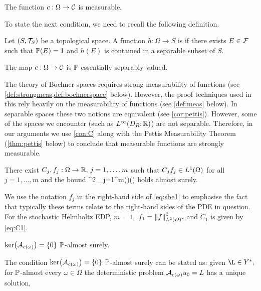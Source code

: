 \label{con:cborel}
 The function $c:\Omega \rightarrow \mathcal C$ is measurable.
\econvar

To state the next condition, we need to recall the following definition.

\label{def:sepval}
Let $\mleft(S,\Top{S}\mright)$ be a topological space. A function $h:\Omega\rightarrow S$ is  if there exists $E \in \mathcal F$ such that $\mathbb P(E) = 1$ and $h(E)$ is contained in a separable subset of $S$.
\ede


\label{con:C}
The map $c:\Omega\rightarrow\mathcal C$  is $\mathbb P$-essentially separably valued.
\econvar

The theory of Bochner spaces requires strong measurability of functions (see \cref{def:strongmeas,def:bochnerspace} below). However, the proof techniques used in this  rely heavily on the measurability of functions (see \cref{def:meas} below). In separable spaces these two notions are equivalent (see \cref{cor:pettis}). However, some of the spaces we encounter (such as $\LiDRRR$) are not separable. Therefore, in our arguments we use \cref{con:C} along with the Pettis Measurability Theorem (\cref{thm:pettis} below) to conclude that measurable functions are strongly measurable.
\ere

\label{con:B}
There exist $C_{j},f_{j}:\Omega\rightarrow \mathbb R, \,j=1,\ldots,m$ such that $\Cj\fj \in \LoO$ for all $j=1,\ldots,m$ and the bound
\beq \label{eq:sbe1}
^2 \leq \sum_{j=1}^m\Cj(\omega)\fj(\omega)
\eeq
holds almost surely.
\econvar

We use the notation $f_j$ in the right-hand side of \eqref{eq:sbe1} to emphasise the fact that typically these terms relate to the right-hand sides of the PDE in question. For the stochastic Helmholtz EDP, $m=1,$ $f_1 = \NLtD{f}^2,$ and $C_1$ is given by \eqref{eq:C1}.
\ere


\label{con:K}
$\ker\mleft(\Acomega\mright) = \set{0}$ $\mathbb P$-almost surely.
\econvar

The condition  $\ker\mleft(\Acomega\mright) = \set{0}$ $\mathbb P$-almost surely can be stated as: given $\L \in \Ys,$ for $\mathbb P$-almost every $\omega \in \Omega$ the deterministic problem $\Acomega \uz = L$ has a unique solution,

